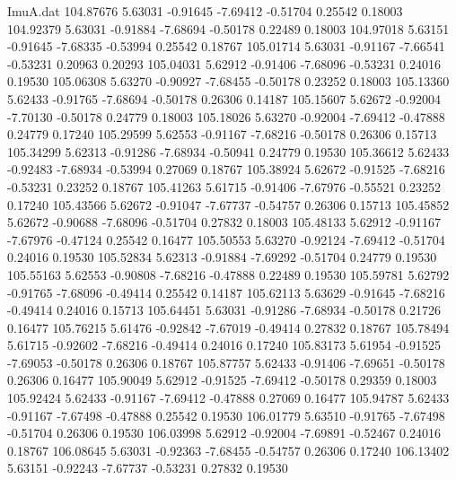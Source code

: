 \begin{filecontents}{ImuA.dat}
 104.87676    5.63031   -0.91645   -7.69412   -0.51704    0.25542    0.18003
 104.92379    5.63031   -0.91884   -7.68694   -0.50178    0.22489    0.18003
 104.97018    5.63151   -0.91645   -7.68335   -0.53994    0.25542    0.18767
 105.01714    5.63031   -0.91167   -7.66541   -0.53231    0.20963    0.20293
 105.04031    5.62912   -0.91406   -7.68096   -0.53231    0.24016    0.19530
 105.06308    5.63270   -0.90927   -7.68455   -0.50178    0.23252    0.18003
 105.13360    5.62433   -0.91765   -7.68694   -0.50178    0.26306    0.14187
 105.15607    5.62672   -0.92004   -7.70130   -0.50178    0.24779    0.18003
 105.18026    5.63270   -0.92004   -7.69412   -0.47888    0.24779    0.17240
 105.29599    5.62553   -0.91167   -7.68216   -0.50178    0.26306    0.15713
 105.34299    5.62313   -0.91286   -7.68934   -0.50941    0.24779    0.19530
 105.36612    5.62433   -0.92483   -7.68934   -0.53994    0.27069    0.18767
 105.38924    5.62672   -0.91525   -7.68216   -0.53231    0.23252    0.18767
 105.41263    5.61715   -0.91406   -7.67976   -0.55521    0.23252    0.17240
 105.43566    5.62672   -0.91047   -7.67737   -0.54757    0.26306    0.15713
 105.45852    5.62672   -0.90688   -7.68096   -0.51704    0.27832    0.18003
 105.48133    5.62912   -0.91167   -7.67976   -0.47124    0.25542    0.16477
 105.50553    5.63270   -0.92124   -7.69412   -0.51704    0.24016    0.19530
 105.52834    5.62313   -0.91884   -7.69292   -0.51704    0.24779    0.19530
 105.55163    5.62553   -0.90808   -7.68216   -0.47888    0.22489    0.19530
 105.59781    5.62792   -0.91765   -7.68096   -0.49414    0.25542    0.14187
 105.62113    5.63629   -0.91645   -7.68216   -0.49414    0.24016    0.15713
 105.64451    5.63031   -0.91286   -7.68934   -0.50178    0.21726    0.16477
 105.76215    5.61476   -0.92842   -7.67019   -0.49414    0.27832    0.18767
 105.78494    5.61715   -0.92602   -7.68216   -0.49414    0.24016    0.17240
 105.83173    5.61954   -0.91525   -7.69053   -0.50178    0.26306    0.18767
 105.87757    5.62433   -0.91406   -7.69651   -0.50178    0.26306    0.16477
 105.90049    5.62912   -0.91525   -7.69412   -0.50178    0.29359    0.18003
 105.92424    5.62433   -0.91167   -7.69412   -0.47888    0.27069    0.16477
 105.94787    5.62433   -0.91167   -7.67498   -0.47888    0.25542    0.19530
 106.01779    5.63510   -0.91765   -7.67498   -0.51704    0.26306    0.19530
 106.03998    5.62912   -0.92004   -7.69891   -0.52467    0.24016    0.18767
 106.08645    5.63031   -0.92363   -7.68455   -0.54757    0.26306    0.17240
 106.13402    5.63151   -0.92243   -7.67737   -0.53231    0.27832    0.19530

\end{filecontents}
